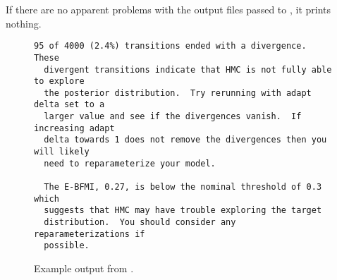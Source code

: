 If there are no apparent problems with the output files passed to
, it prints nothing.

\begin{figure}
\begin{Verbatim}[fontsize=\footnotesize]
  95 of 4000 (2.4%) transitions ended with a divergence.  These
  divergent transitions indicate that HMC is not fully able to explore
  the posterior distribution.  Try rerunning with adapt delta set to a
  larger value and see if the divergences vanish.  If increasing adapt
  delta towards 1 does not remove the divergences then you will likely
  need to reparameterize your model.

  The E-BFMI, 0.27, is below the nominal threshold of 0.3 which
  suggests that HMC may have trouble exploring the target
  distribution.  You should consider any reparameterizations if
  possible.
\end{Verbatim}
\caption{Example output from .}
\label{bin-diagnose-eg.figure}
\end{figure}

